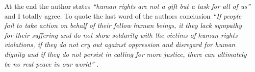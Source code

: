At the end the author states \emph{``human rights are not a gift but a task
for all of us''} \cite[. 37]{tfohr} and I totally agree. To quote the last
word of the authors conclusion \emph{``If people fail to take action on
behalf of their fellow human beings, it they lack sympathy for their
suffering and do not show soldarity with the victims of human rights
violations, if they do not cry out against oppression and disregard for
human dignity and if they do not persist in calling for more justice,
there can ultimately be no real peace in our world''} \cite[p. 37]{tfohr}.
